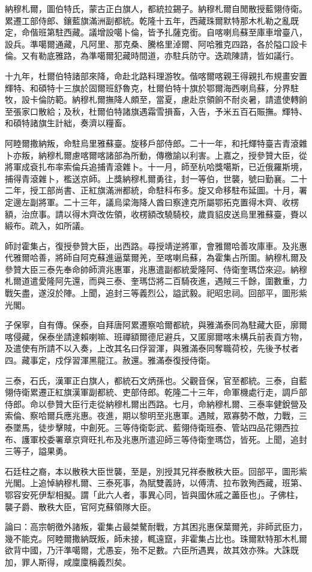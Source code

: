\begin{pinyinscope}
納穆札爾，圖伯特氏，蒙古正白旗人，都統拉錫子。納穆札爾自閒散授藍翎侍衛。累遷工部侍郎、鑲藍旗滿洲副都統。乾隆十五年，西藏珠爾默特那木札勒之亂既定，命偕班第駐西藏。議增設噶卜倫，皆予扎薩克銜。自喀喇烏蘇至庫車增臺八，設兵。準噶爾通藏，凡阿里、那克桑、騰格里淖爾、阿哈雅克四路，各於隘口設卡倫。又有勒底雅路，為準噶爾犯藏時間道，亦駐兵防守。迭疏陳請，皆如議行。

十九年，杜爾伯特諸部來降，命赴北路料理游牧。偕喀爾喀親王得親扎布規畫安置輝特、和碩特十三旗於固爾班舒魯克，杜爾伯特十旗於鄂爾海西喇烏蘇，分界駐牧，設卡倫防範。納穆札爾撫降人頗至，當夏，慮赴京領餉不耐炎暑，請遣使轉餉至張家口散給；及秋，杜爾伯特諸旗遇霜雪損畜，入告，予米五百石賑撫。輝特、和碩特諸旗生計絀，奏濟以糧畜。

阿睦爾撒納叛，命駐烏里雅蘇臺。旋移戶部侍郎。二十一年，和托輝特臺吉青滾雜卜亦叛，納穆札爾慮喀爾喀諸部為所動，傳檄諭以利害。上嘉之，授參贊大臣，從將軍成袞扎布率索倫兵追捕青滾雜卜。十一月，師至杭哈獎噶斯，已近俄羅斯境，捕得青滾雜卜，檻送京師。上獎納穆札爾勇往，封一等伯，世襲，號曰勤襄。二十二年，授工部尚書、正紅旗滿洲都統，命駐科布多。旋又命移駐布延圖。十月，署定邊左副將軍。二十三年，議烏梁海降人酋曰察達克所屬鄂拓克置得木齊、收楞額，治庶事。請以得木齊改佐領，收楞額改驍騎校，歲貢貂皮送烏里雅蘇臺，賚以緞布。疏入，如所議。

師討霍集占，復授參贊大臣，出西路。尋授靖逆將軍，會雅爾哈善攻庫車。及兆惠代雅爾哈善，將師自阿克蘇進逼葉爾羌，至喀喇烏蘇，為霍集占所圍。納穆札爾及參贊大臣三泰先奉命帥師濟兆惠軍，兆惠遣副都統愛隆阿、侍衛奎瑪岱來迎。納穆札爾道遣愛隆阿先還，而與三泰、奎瑪岱將二百騎夜進，遇賊三千餘，圍數重，力戰矢盡，遂沒於陣。上聞，追封三等義烈公，謚武毅。祀昭忠祠。回部平，圖形紫光閣。

子保寧，自有傳。保泰，自拜唐阿累遷察哈爾都統，與雅滿泰同為駐藏大臣，廓爾喀侵藏，保泰坐請達賴喇嘛、班禪額爾德尼避兵，又匿廓爾喀未構兵前表貢方物，及遣使有所請不以入奏，上改其名曰俘習渾，與雅滿泰同奪職荷校，先後予杖者四。藏事定，戍俘習渾黑龍江。赦還。雅滿泰復授侍衛。

三泰，石氏，漢軍正白旗人，都統石文炳孫也。父觀音保，官至都統。三泰，自藍翎侍衛累遷正紅旗漢軍副都統、吏部侍郎。乾隆二十三年，命軍機處行走，調戶部侍郎。命以參贊大臣行走從納穆札爾出西路。七月，命納穆札爾、三泰率健銳營及索倫、察哈爾兵應兆惠。夜進，期以黎明至兆惠軍。遇賊，眾寡勢不敵，力戰，三泰墜馬，徒步擊賊，中創死。三等侍衛彰武、藍翎侍衛班泰、管站四品花翎西拉布、護軍校委署章京齊旺扎布及兆惠所遣迎師三等侍衛奎瑪岱，皆死。上聞，追封三等子，謚果勇。

石廷柱之裔，本以散秩大臣世襲，至是，別授其兄祥泰散秩大臣。回部平，圖形紫光閣。上追悼納穆札爾、三泰死事，為賦雙義詩，以傅清、拉布敦殉西藏，班第、鄂容安死伊犁相擬。謂「此六人者，事異心同，皆與國休戚之藎臣也」。子佛柱，襲子爵、散秩大臣，官阿克蘇領隊大臣。

論曰：高宗朝徼外諸叛，霍集占最桀驁耐戰，方其困兆惠保葉爾羌，非師武臣力，幾不能克。阿睦爾撒納既叛，師未接，輒遠竄，非霍集占比也。珠爾默特那木札爾欲背中國，乃汗準噶爾，尤愚妄，殆不足數。六臣所遇異，故其效亦殊。大誅既加，罪人斯得，咸廩廩稱義烈矣。


\end{pinyinscope}